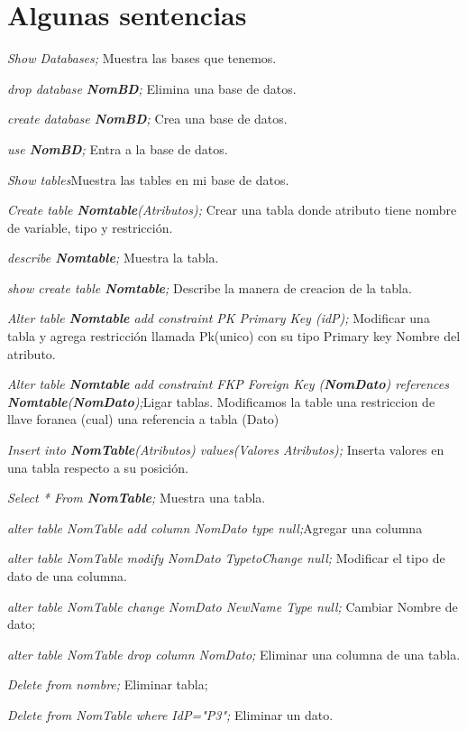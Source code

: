 \documentclass[12pt, fleqn]{report}                             %
\theoremstyle{break}                                            %
\begin{document}
	\section{Algunas sentencias}

	\emph{Show Databases;} Muestra las bases que tenemos.


	\emph{drop database \textbf{NomBD};} Elimina una base de datos.

	\emph{create database \textbf{NomBD};} Crea una base de datos.

	\emph{use \textbf{NomBD};} Entra a la base de datos.

	\emph{Show tables}Muestra las tables en mi base de datos.
 
	\emph{Create table \textbf{Nomtable}(Atributos);} Crear una tabla donde atributo tiene nombre de variable, tipo y restricción.

	\emph{describe \textbf{Nomtable};} Muestra la tabla.

	\emph{show create table \textbf{Nomtable};} Describe la manera de creacion de la tabla.

	\emph{Alter table \textbf{Nomtable} add constraint PK Primary Key (idP);} Modificar una tabla y agrega restricción llamada Pk(unico) con su tipo Primary key Nombre del atributo.

	\emph{Alter table \textbf{Nomtable} add constraint FKP Foreign Key (\textbf{NomDato}) references \textbf{Nomtable}(\textbf{NomDato});}Ligar tablas. Modificamos la table una restriccion de llave foranea (cual) una referencia a tabla (Dato)


	\emph{Insert into \textbf{NomTable}(Atributos) values(Valores Atributos);} Inserta valores en una tabla respecto a su posición.

	\emph{Select * From \textbf{NomTable};} Muestra una tabla.

	\emph{alter table NomTable add column NomDato type null;}Agregar una columna

	\emph{alter table NomTable modify NomDato TypetoChange null;} Modificar el tipo de dato de una columna.

	\emph{alter table NomTable change NomDato NewName Type null;} Cambiar Nombre de dato;

	\emph{alter table NomTable drop column NomDato;} Eliminar una columna de una tabla.

	\emph{Delete from nombre;} Eliminar tabla;


	\emph{Delete from NomTable where IdP="P3";} Eliminar un dato.
\end{document}
